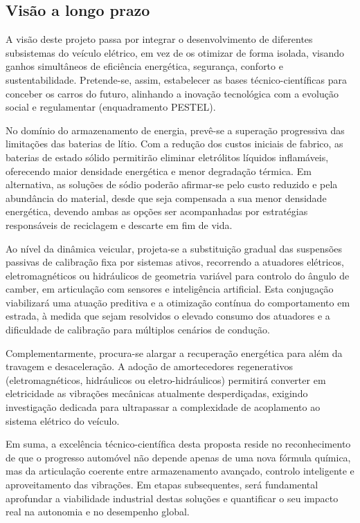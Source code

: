 
\subsection{Visão a longo prazo}
\begin{campotexto}
A visão deste projeto passa por integrar o desenvolvimento de diferentes subsistemas do veículo elétrico, em vez de os otimizar de forma isolada, visando ganhos simultâneos de eficiência energética, segurança, conforto e sustentabilidade. Pretende-se, assim, estabelecer as bases técnico-científicas para conceber os carros do futuro, alinhando a inovação tecnológica com a evolução social e regulamentar (enquadramento PESTEL).

No domínio do armazenamento de energia, prevê-se a superação progressiva das limitações das baterias de lítio. Com a redução dos custos iniciais de fabrico, as baterias de estado sólido permitirão eliminar eletrólitos líquidos inflamáveis, oferecendo maior densidade energética e menor degradação térmica. Em alternativa, as soluções de sódio poderão afirmar-se pelo custo reduzido e pela abundância do material, desde que seja compensada a sua menor densidade energética, devendo ambas as opções ser acompanhadas por estratégias responsáveis de reciclagem e descarte em fim de vida.

Ao nível da dinâmica veicular, projeta-se a substituição gradual das suspensões passivas de calibração fixa por sistemas ativos, recorrendo a atuadores elétricos, eletromagnéticos ou hidráulicos de geometria variável para controlo do ângulo de camber, em articulação com sensores e inteligência artificial. Esta conjugação viabilizará uma atuação preditiva e a otimização contínua do comportamento em estrada, à medida que sejam resolvidos o elevado consumo dos atuadores e a dificuldade de calibração para múltiplos cenários de condução.

Complementarmente, procura-se alargar a recuperação energética para além da travagem e desaceleração. A adoção de amortecedores regenerativos (eletromagnéticos, hidráulicos ou eletro-hidráulicos) permitirá converter em eletricidade as vibrações mecânicas atualmente desperdiçadas, exigindo investigação dedicada para ultrapassar a complexidade de acoplamento ao sistema elétrico do veículo.

Em suma, a excelência técnico-científica desta proposta reside no reconhecimento de que o progresso automóvel não depende apenas de uma nova fórmula química, mas da articulação coerente entre armazenamento avançado, controlo inteligente e aproveitamento das vibrações. Em etapas subsequentes, será fundamental aprofundar a viabilidade industrial destas soluções e quantificar o seu impacto real na autonomia e no desempenho global.
\end{campotexto}


